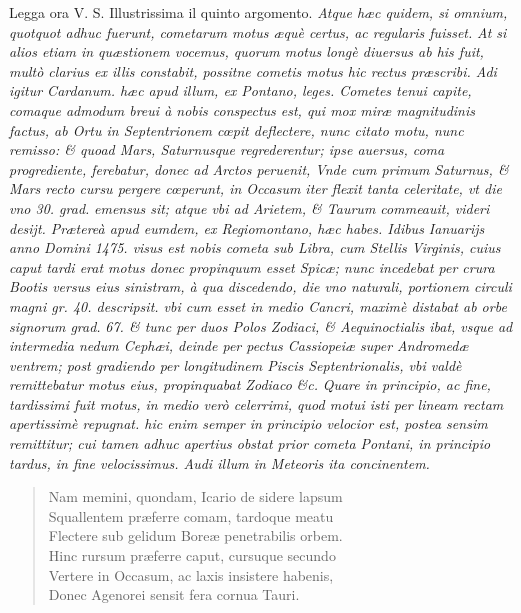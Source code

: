 \documentclass[11pt,twoside,openany]{book}
\begin{document}
\par\bigskip\noindent{}\enspace Legga ora V. S. Illustrissima il quinto argomento. \textit{Atque hæc quidem, si omnium, quotquot adhuc fuerunt, cometarum motus æquè certus, ac regularis fuisset. }\textit{At si alios etiam in quæstionem vocemus, quorum motus longè diuersus ab his fuit, multò clarius ex illis constabit, possitne cometis motus hic rectus præscribi. Adi igitur Cardanum. hæc apud illum, ex Pontano, leges. Cometes tenui capite, comaque admodum breui à nobis conspectus est, qui mox miræ magnitudinis factus, ab Ortu in Septentrionem cœpit deflectere, nunc citato motu, nunc remisso: \& quoad Mars, Saturnusque regrederentur; ipse auersus, coma progrediente, ferebatur, donec ad Arctos peruenit, Vnde cum primum Saturnus, \& Mars recto cursu pergere cœperunt, in Occasum iter flexit tanta celeritate, vt die vno 30. grad. }\textit{emensus sit; atque vbi ad Arietem, \& Taurum commeauit, videri desijt. Prætereà apud eumdem, ex Regiomontano, hæc habes. Idibus Ianuarijs anno Domini 1475. visus est nobis cometa sub Libra, cum Stellis Virginis, cuius caput tardi erat motus donec propinquum esset Spicæ; nunc incedebat per crura Bootis versus eius sinistram, à qua discedendo, die vno naturali, portionem circuli magni gr. 40. descripsit. vbi cum esset in medio Cancri, maximè distabat ab orbe signorum grad. }\textit{67. \& tunc per duos Polos Zodiaci, \& Aequinoctialis ibat, vsque ad intermedia nedum Cephæi, deinde per pectus Cassiopeiæ super Andromedæ ventrem; post gradiendo per longitudinem Piscis Septentrionalis, vbi valdè remittebatur motus eius, propinquabat Zodiaco }\textit{\&c.}\textit{ Quare in principio, ac fine, tardissimi fuit motus, in medio verò celerrimi, quod motui isti per lineam rectam apertissimè repugnat. hic enim semper in principio velocior est, postea sensim remittitur; cui tamen adhuc apertius obstat prior cometa Pontani, in principio tardus, in fine velocissimus. Audi illum in Meteoris ita concinentem.}


\begin{verse}

Nam memini, quondam, Icario de sidere lapsum \\

Squallentem præferre comam, tardoque meatu \\

Flectere sub gelidum Boreæ penetrabilis orbem. \\

Hinc rursum præferre caput, cursuque secundo \\

Vertere in Occasum, ac laxis insistere habenis, \\

Donec Agenorei sensit fera cornua Tauri. \\

\end{verse}
\end{document}
